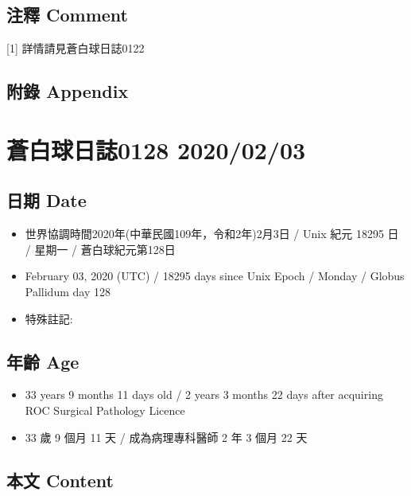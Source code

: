\documentclass[
]{article}
\providecommand{\tightlist}{%
  \setlength{\itemsep}{0pt}\setlength{\parskip}{0pt}}
\begin{document}
\hypertarget{ux6ce8ux91cb-comment-62}{%
\subsection{注釋 Comment}\label{ux6ce8ux91cb-comment-62}}

{[}1{]} 詳情請見蒼白球日誌0122

\hypertarget{ux9644ux9304-appendix-63}{%
\subsection{附錄 Appendix}\label{ux9644ux9304-appendix-63}}

\hypertarget{ux84bcux767dux7403ux65e5ux8a8c0128-20200203}{%
\section{蒼白球日誌0128
2020/02/03}\label{ux84bcux767dux7403ux65e5ux8a8c0128-20200203}}

\hypertarget{ux65e5ux671f-date-64}{%
\subsection{日期 Date}\label{ux65e5ux671f-date-64}}

\begin{itemize}
\tightlist
\item
  世界協調時間2020年(中華民國109年，令和2年)2月3日 / Unix 紀元 18295 日
  / 星期一 / 蒼白球紀元第128日
\item
  February 03, 2020 (UTC) / 18295 days since Unix Epoch / Monday /
  Globus Pallidum day 128
\item
  特殊註記:
\end{itemize}

\hypertarget{ux5e74ux9f61-age-64}{%
\subsection{年齡 Age}\label{ux5e74ux9f61-age-64}}

\begin{itemize}
\tightlist
\item
  33 years 9 months 11 days old / 2 years 3 months 22 days after
  acquiring ROC Surgical Pathology Licence
\item
  33 歲 9 個月 11 天 / 成為病理專科醫師 2 年 3 個月 22 天
\end{itemize}

\hypertarget{ux672cux6587-content-64}{%
\subsection{本文 Content}\label{ux672cux6587-content-64}}
\end{document}
